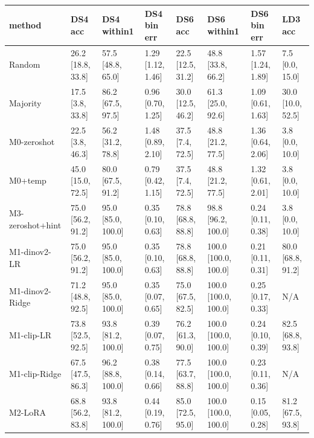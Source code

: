 \begin{tabular}{llllllll}
\toprule
method & DS4 acc & DS4 within1 & DS4 bin err & DS6 acc & DS6 within1 & DS6 bin err & LD3 acc \\
\midrule
Random & 26.2 [18.8, 33.8] & 57.5 [48.8, 65.0] & 1.29 [1.12, 1.46] & 22.5 [12.5, 31.2] & 48.8 [33.8, 66.2] & 1.57 [1.24, 1.89] & 7.5 [0.0, 15.0] \\
Majority & 17.5 [3.8, 33.8] & 86.2 [67.5, 97.5] & 0.96 [0.70, 1.25] & 30.0 [12.5, 46.2] & 61.3 [25.0, 92.6] & 1.09 [0.61, 1.63] & 30.0 [10.0, 52.5] \\
M0-zeroshot & 22.5 [3.8, 46.3] & 56.2 [31.2, 78.8] & 1.48 [0.89, 2.10] & 37.5 [7.4, 72.5] & 48.8 [21.2, 77.5] & 1.36 [0.64, 2.06] & 3.8 [0.0, 10.0] \\
M0+temp & 45.0 [15.0, 72.5] & 80.0 [67.5, 91.2] & 0.79 [0.42, 1.15] & 37.5 [7.4, 72.5] & 48.8 [21.2, 77.5] & 1.32 [0.61, 2.01] & 3.8 [0.0, 10.0] \\
M3-zeroshot+hint & 75.0 [56.2, 91.2] & 95.0 [85.0, 100.0] & 0.35 [0.10, 0.63] & 78.8 [68.8, 88.8] & 98.8 [96.2, 100.0] & 0.24 [0.11, 0.38] & 3.8 [0.0, 10.0] \\
M1-dinov2-LR & 75.0 [56.2, 91.2] & 95.0 [85.0, 100.0] & 0.35 [0.10, 0.63] & 78.8 [68.8, 88.8] & 100.0 [100.0, 100.0] & 0.21 [0.11, 0.31] & 80.0 [68.8, 91.2] \\
M1-dinov2-Ridge & 71.2 [48.8, 92.5] & 95.0 [85.0, 100.0] & 0.35 [0.07, 0.65] & 75.0 [67.5, 82.5] & 100.0 [100.0, 100.0] & 0.25 [0.17, 0.33] & N/A \\
M1-clip-LR & 73.8 [52.5, 92.5] & 93.8 [81.2, 100.0] & 0.39 [0.07, 0.75] & 76.2 [61.3, 90.0] & 100.0 [100.0, 100.0] & 0.24 [0.10, 0.39] & 82.5 [68.8, 93.8] \\
M1-clip-Ridge & 67.5 [47.5, 86.3] & 96.2 [88.8, 100.0] & 0.38 [0.14, 0.66] & 77.5 [63.7, 88.8] & 100.0 [100.0, 100.0] & 0.23 [0.11, 0.36] & N/A \\
M2-LoRA & 68.8 [56.2, 83.8] & 93.8 [81.2, 100.0] & 0.44 [0.19, 0.76] & 85.0 [72.5, 95.0] & 100.0 [100.0, 100.0] & 0.15 [0.05, 0.28] & 81.2 [67.5, 93.8] \\
\bottomrule
\end{tabular}
